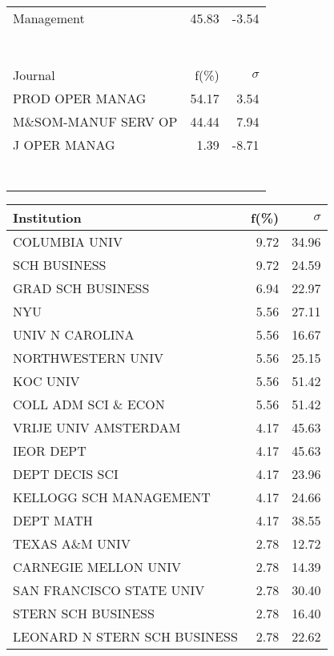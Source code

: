\documentclass[a4paper,11pt]{report}
\begin{document}
\begin{landscape}
\begin{table}[!ht]
{\begin{tabular}{|l r  r|}
Management & 45.83 & -3.54\\
 &  & \\
 &  & \\
 &  & \\
 &  & \\
 &  & \\
 &  & \\
 &  & \\
\hline
\hline
Journal & f(\%) & $\sigma$\\
\hline
PROD OPER MANAG & 54.17 & 3.54\\
M\&SOM-MANUF SERV OP & 44.44 & 7.94\\
J OPER MANAG & 1.39 & -8.71\\
 &  & \\
 &  & \\
 &  & \\
 &  & \\
 &  & \\
 &  & \\
 &  & \\
\hline
\end{tabular}
}
{\scriptsize\begin{tabular}{|l r r|}
\hline
Institution & f(\%) & $\sigma$\\
\hline
COLUMBIA UNIV & 9.72 & 34.96\\
SCH BUSINESS & 9.72 & 24.59\\
GRAD SCH BUSINESS & 6.94 & 22.97\\
NYU & 5.56 & 27.11\\
UNIV N CAROLINA & 5.56 & 16.67\\
NORTHWESTERN UNIV & 5.56 & 25.15\\
KOC UNIV & 5.56 & 51.42\\
COLL ADM SCI \& ECON & 5.56 & 51.42\\
VRIJE UNIV AMSTERDAM & 4.17 & 45.63\\
IEOR DEPT & 4.17 & 45.63\\
DEPT DECIS SCI & 4.17 & 23.96\\
KELLOGG SCH MANAGEMENT & 4.17 & 24.66\\
DEPT MATH & 4.17 & 38.55\\
TEXAS A\&M UNIV & 2.78 & 12.72\\
CARNEGIE MELLON UNIV & 2.78 & 14.39\\
SAN FRANCISCO STATE UNIV & 2.78 & 30.40\\
STERN SCH BUSINESS & 2.78 & 16.40\\
LEONARD N STERN SCH BUSINESS & 2.78 & 22.62\\

\end{tabular}}
\end{table}
\end{landscape}
\end{document}
